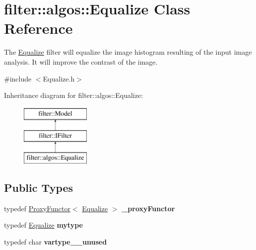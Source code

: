 \hypertarget{classfilter_1_1algos_1_1_equalize}{}\section{filter\+:\+:algos\+:\+:Equalize Class Reference}
\label{classfilter_1_1algos_1_1_equalize}


The \hyperlink{classfilter_1_1algos_1_1_equalize}{Equalize} filter will equalize the image histogram resulting of the input image analysis. It will improve the contrast of the image.  




{\ttfamily \#include $<$Equalize.\+h$>$}

Inheritance diagram for filter\+:\+:algos\+:\+:Equalize\+:\begin{figure}[H]
\begin{center}
\leavevmode
\includegraphics[height=3.000000cm]{d9/ddf/classfilter_1_1algos_1_1_equalize}
\end{center}
\end{figure}
\subsection*{Public Types}
\begin{DoxyCompactItemize}
\item 
\mbox{\label{classfilter_1_1algos_1_1_equalize_a0c7b19c96f65d70f4d96cd4eb24f4a70}} 
typedef \hyperlink{class_proxy_functor}{Proxy\+Functor}$<$ \hyperlink{classfilter_1_1algos_1_1_equalize}{Equalize} $>$ {\bfseries \+\_\+proxy\+Functor}
\item 
\mbox{\label{classfilter_1_1algos_1_1_equalize_a571bedd9a3a876726a8f5096ac1722a6}} 
typedef \hyperlink{classfilter_1_1algos_1_1_equalize}{Equalize} {\bfseries mytype}
\item 
\mbox{\label{classfilter_1_1algos_1_1_equalize_a4680b6a6b15ed69ad53d47bae4ca5153}} 
typedef char {\bfseries vartype\+\_\+\+\_\+unused}
\end{DoxyCompactItemize}
